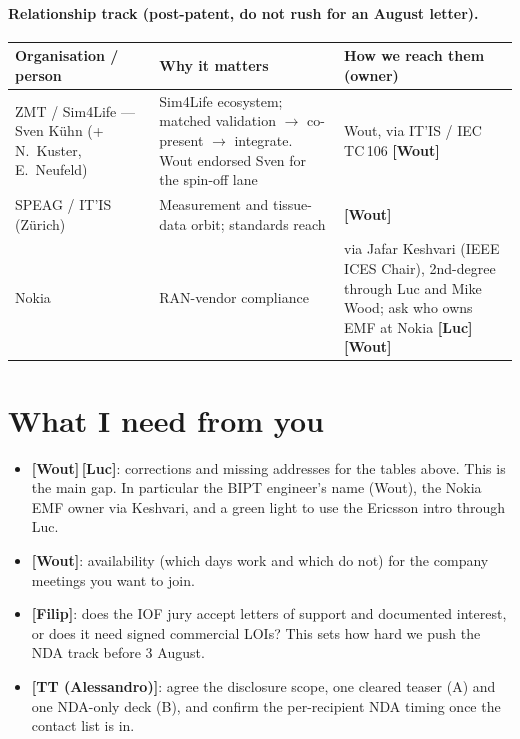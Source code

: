 \documentclass[11pt,a4paper]{article}
\newcommand{\owner}[1]{\textbf{[#1]}}
\begin{document}
\paragraph{Relationship track (post-patent, do not rush for an August letter).}
\begin{tabularx}{\textwidth}{@{}p{3.0cm} X p{3.9cm}@{}}
\toprule
\textbf{Organisation / person} & \textbf{Why it matters} & \textbf{How we reach them (owner)} \\
\midrule
ZMT / Sim4Life --- Sven K\"uhn (+ N.\ Kuster, E.\ Neufeld) & Sim4Life ecosystem; matched validation $\to$ co-present $\to$ integrate. Wout endorsed Sven for the spin-off lane & Wout, via IT'IS / IEC TC\,106 \owner{Wout} \\
SPEAG / IT'IS (Z\"urich) & Measurement and tissue-data orbit; standards reach & \owner{Wout} \\
Nokia & RAN-vendor compliance & via Jafar Keshvari (IEEE ICES Chair), 2nd-degree through Luc and Mike Wood; ask who owns EMF at Nokia \owner{Luc}\,\owner{Wout} \\
\bottomrule
\end{tabularx}

\section{What I need from you}
\begin{itemize}
  \item \owner{Wout}\,\owner{Luc}: corrections and missing addresses for the tables above. This is the main gap. In particular the BIPT engineer's name (Wout), the Nokia EMF owner via Keshvari, and a green light to use the Ericsson intro through Luc.
  \item \owner{Wout}: availability (which days work and which do not) for the company meetings you want to join.
  \item \owner{Filip}: does the IOF jury accept letters of support and documented interest, or does it need signed commercial LOIs? This sets how hard we push the NDA track before 3 August.
  \item \owner{TT (Alessandro)}: agree the disclosure scope, one cleared teaser (A) and one NDA-only deck (B), and confirm the per-recipient NDA timing once the contact list is in.
\end{itemize}
\end{document}

